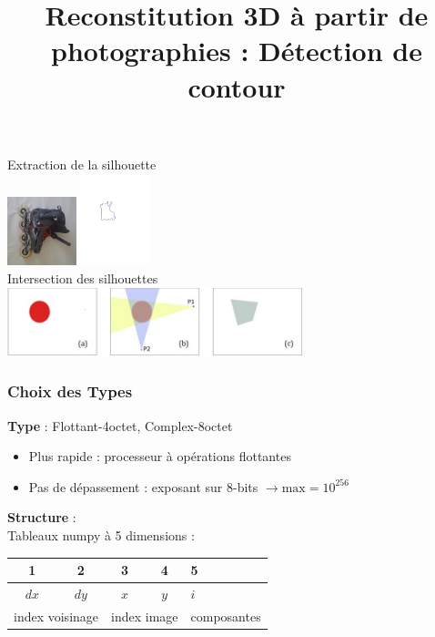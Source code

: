 \documentclass[french]{beamer}
\title{Reconstitution 3D à partir de photographies : Détection de contour}
\author{}
\date{}
\begin{document}

\begin{frame}
	\maketitle
	\vspace{-3cm}
	Extraction de la silhouette\\
	\medskip
	\includegraphics[width=2cm]{images/roller.png} \; \includegraphics[width=2cm]{images/roller_poly.jpg}\\
	Intersection des silhouettes\\
	\medskip
	\includegraphics[height=2cm]{images/silhouettes.jpg}
\end{frame}

\begin{frame}
	\frametitle{Choix des Types}
	\textbf{Type} : Flottant-4octet, Complex-8octet
	\smallskip
	\begin{itemize}
		\item Plus rapide : processeur à opérations flottantes
		\item Pas de dépassement : exposant sur 8-bits $\longrightarrow \text{max} =  10^{256}$
	\end{itemize}
	\bigskip
	\textbf{Structure} : \\
	\smallskip
	Tableaux numpy à 5 dimensions : \\
	\begin{tabular}{|c|c|c|c|l|}
		\hline
		1 & 2 & 3 & 4 & 5 \\ \hline
		$dx$ & $dy$ & $x$ & $y$ & $i$ \\ \hline
		\multicolumn{2}{|l|}{index voisinage} & \multicolumn{2}{|l|}{index image} & composantes \\
		\hline
	\end{tabular}
\end{frame}
\end{document}
